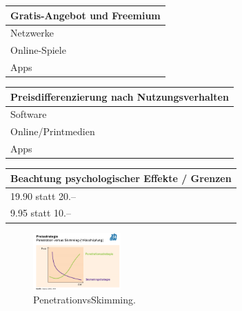 \documentclass[../ZF_Wing.tex]{subfiles}
\begin{document}
\begin{table} [H]

\begin{tabular}{l}

\colorbox{pink!30}{\textbf{Gratis-Angebot und Freemium}}

\\\hline
Netzwerke\\
Online-Spiele\\
Apps\\
\end{tabular}
\end{table}

\begin{table} [H]

\begin{tabular}{l}

\colorbox{pink!30}{\textbf{Preisdifferenzierung nach Nutzungsverhalten}}

\\\hline
Software\\
Online/Printmedien\\
Apps\\

\end{tabular}
\end{table}


\begin{table} [H]

\begin{tabular}{l}

\colorbox{pink!30}{\textbf{Beachtung psychologischer Effekte / Grenzen}}

\\\hline
19.90 statt 20.--\\
9.95 statt 10.--\\

\end{tabular}
\end{table}



\begin{figure}[H]
\centering
\includegraphics[width=0.3\textwidth]{Resources/Image/PenetrationvsSkimming.png}
\caption{\label{fig:PenetrationvsSkimming}PenetrationvsSkimming.}
\end{figure}
\end{document}
